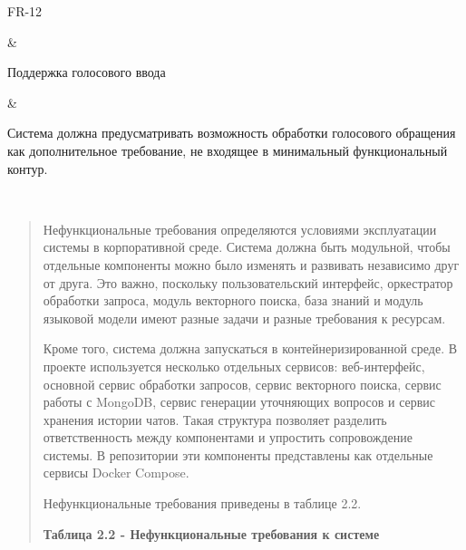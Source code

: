 \documentclass[
]{article}
\begin{document}
\begin{longtable}[]
\begin{minipage}[b]{\linewidth}\raggedright
FR-12
\end{minipage} & \begin{minipage}[b]{\linewidth}\raggedright
Поддержка голосового ввода
\end{minipage} & \begin{minipage}[b]{\linewidth}\raggedright
Система должна предусматривать возможность обработки голосового
обращения как дополнительное требование, не входящее в минимальный
функциональный контур.
\end{minipage} \\
\midrule\noalign{}
\endhead
\bottomrule\noalign{}
\endlastfoot
\end{longtable}

\begin{quote}
Нефункциональные требования определяются условиями эксплуатации системы
в корпоративной среде. Система должна быть модульной, чтобы отдельные
компоненты можно было изменять и развивать независимо друг от друга. Это
важно, поскольку пользовательский интерфейс, оркестратор обработки
запроса, модуль векторного поиска, база знаний и модуль языковой модели
имеют разные задачи и разные требования к ресурсам.

Кроме того, система должна запускаться в контейнеризированной среде. В
проекте используется несколько отдельных сервисов: веб-интерфейс,
основной сервис обработки запросов, сервис векторного поиска, сервис
работы с MongoDB, сервис генерации уточняющих вопросов и сервис хранения
истории чатов. Такая структура позволяет разделить ответственность между
компонентами и упростить сопровождение системы. В репозитории эти
компоненты представлены как отдельные сервисы Docker Compose.

Нефункциональные требования приведены в таблице 2.2.

\textbf{Таблица 2.2 - Нефункциональные требования к системе}
\end{quote}
\end{document}
